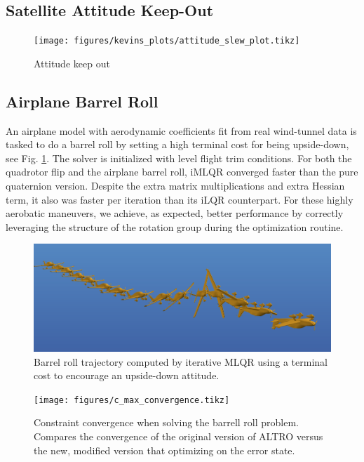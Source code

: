 \documentclass[letterpaper, 10 pt, conference]{ieeeconf}  %
\begin{document}
        \subsection{Satellite Attitude Keep-Out}
        \begin{figure}
            \centering
            \texttt{[image: figures/kevins\_plots/attitude\_slew\_plot.tikz]}
            \caption{Attitude keep out}
        \end{figure}


        \subsection{Airplane Barrel Roll}
        An airplane model with aerodynamic coefficients fit from real wind-tunnel data is
        tasked to do a barrel roll by setting a high terminal cost for being upside-down,
        see Fig. \ref{fig:barrellroll}. The solver is initialized with level flight trim
        conditions. For both the quadrotor flip and the airplane barrel roll, iMLQR
        converged faster than the pure quaternion version. Despite the extra matrix
        multiplications and extra Hessian term, it also was faster per iteration than its
        iLQR counterpart. For these highly aerobatic maneuvers, we achieve, as expected,
        better performance by correctly leveraging the structure of the rotation group
        during the optimization routine.
        
        \begin{figure}[h]
            \centering
            \includegraphics[width=\columnwidth]{figures/barrellroll.png}
            \caption{Barrel roll trajectory computed by iterative MLQR using a terminal cost to encourage an upside-down attitude.}
            \label{fig:barrellroll}
        \end{figure}

        \begin{figure}[h]
            \centering
            \texttt{[image: figures/c\_max\_convergence.tikz]}
            \caption{Constraint convergence when solving the barrell roll problem. Compares 
            the convergence of the original version of ALTRO versus the new, modified version
            that optimizing on the error state.}
            \label{fig:c_max_convergence}
        \end{figure}
\end{document}
